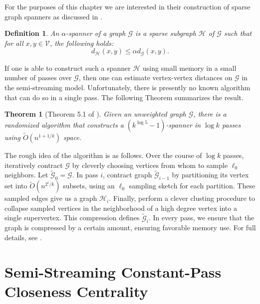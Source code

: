 \documentclass{report}
\newtheorem{theorem}{Theorem}[section]
\newtheorem{definition}{Definition}[section]
\begin{document}
For the purposes of this chapter we are interested in their construction of sparse graph spanners as discussed in \cite{ahn2012graph}. 
%
\begin{definition}
An $\alpha$-spanner of a graph $\mathcal{G}$ is a sparse subgraph $\mathcal{H}$ of $\mathcal{G}$ such that for all $x,y \in \mathcal{V}$, the following holds: 
\begin{equation} \label{eq:spanner}
d_\mathcal{H}(x,y) \leq \alpha d_\mathcal{G}(x,y).
\end{equation}
\end{definition}
%
If one is able to construct such a spanner $\mathcal{H}$ using small memory in a small number of passes over $\mathcal{G}$, then one can estimate vertex-vertex distances on $\mathcal{G}$ in the semi-streaming model. 
Unfortunately, there is presently no known algorithm that can do so in a single pass. 
The following Theorem summarizes the result.
%
\begin{theorem}[Theorem 5.1 of \cite{ahn2012graph}] \label{thm:spanner}
Given an unweighted graph $\mathcal{G}$, there is a randomized algorithm that constructs a $(k^{\log 5}-1)$-spanner in $\log k$ passes using $\widetilde{O}(n^{1+1/k})$ space. 
\end{theorem}
%
The rough idea of the algorithm is as follows.
Over the course of $\log k$ passes, iteratively contract $\mathcal{G}$ by cleverly choosing vertices from whom to sample $\ell_0$ neighbors.
Let $\widetilde{\mathcal{G}}_0 = \mathcal{G}$. 
In pass $i$, contract graph $\widetilde{\mathcal{G}}_{i-1}$ by partitioning its vertex set into $\widetilde{O}(n^{2^i/k})$ subsets, using an $\ell_0$ sampling sketch for each partition. 
These sampled edges give us a graph $\mathcal{H}_i$. 
Finally, perform a clever clusting procedure to collapse sampled vertices in the neighborhood of a high degree vertex into a single supervertex.
This compression defines $\widetilde{\mathcal{G}}_i$. 
In every pass, we ensure that the graph is compressed by a certain amount, ensuring favorable memory use.
For full details, see \cite{ahn2012graph}.


\section{Semi-Streaming Constant-Pass Closeness Centrality} \label{sec:sscc}
\end{document}
